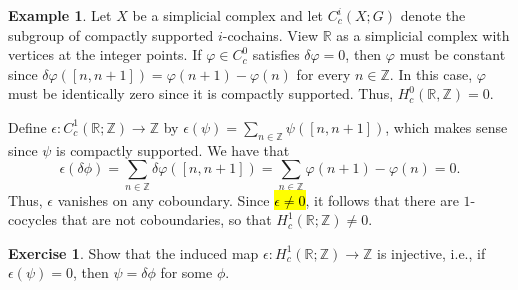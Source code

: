 \documentclass[10pt,letterpaper,cm]{nupset}
\theoremstyle{definition}
\newtheorem{exmp}[definition]{Example}
\theoremstyle{theorem}
\newtheorem{exercise}[definition]{Exercise}
\theoremstyle{remark}
\newcommand{\R}{\mathbb{R}}
\newcommand{\Z}{\mathbb Z}
\newcommand{\1}{\mathbb{1}}
\newcommand{\0}{\vec 0}
\begin{document}
\begin{exmp}
Let  $X$ be a simplicial complex and let $C^i_c(X;G)$ denote the subgroup of compactly supported $i$-cochains. View $\R$ as a simplicial complex with vertices at the integer points. If $\varphi \in C^0_c$ satisfies $\delta{\varphi} =0$, then $\varphi$ must be constant since $\delta{\varphi}([n, n+1]) = \varphi(n+1) - \varphi(n)$ for every $n\in \Z$. In this case, $\varphi$ must be identically zero since it is compactly supported. Thus, $H^0_c(\R, \Z) =0$.

Define $\epsilon : C_c^1(\R; \Z) \to \Z$ by $ \epsilon(\psi) = \sum_{n\in \Z}\psi([n , n+1])$, which makes sense since $\psi$ is compactly supported. We have that $$\epsilon(\delta{\phi}) = \sum_{n\in \Z} \delta{\varphi}([n, n+1]) = \sum_{n\in \Z} \varphi(n+1) - \varphi(n) =0.$$ Thus, $\epsilon$ vanishes on any coboundary. Since \hl{$\epsilon \ne 0$}, it follows that there are $1$-cocycles that are not coboundaries, so that $H_c^1(\R; \Z) \ne 0$. 
\begin{exercise}
Show that the induced map $\epsilon: H_c^1(\R; \Z) \to \Z$ is injective, i.e., if $\epsilon(\psi) =0$, then $\psi= \delta{\phi}$ for some $\phi$.
\end{exercise}
\end{exmp}
\end{document}
